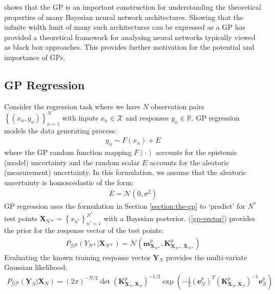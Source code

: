 \documentclass{article}
\newcommand{\GP}{\operatorname{\mathcal{GP}}}
\numberwithin{equation}{section}
\begin{document}
\cite{novak2019neural} shows that the GP is an important construction for understanding the theoretical properties of many Bayesian neural network architectures. Showing that the infinite width limit of many such architectures can be expressed as a GP has provided a theoretical framework for analysing neural networks typically viewed as black box approaches. This provides further motivation for the potential and importance of GPs.

\subsection{GP Regression}
Consider the regression task where we have $N$ observation pairs $\left\{(x_n, y_n)\right\}_{n=1}^{N}$ with inputs $x_n \in \mathcal{X}$ and responses $y_n \in \mathbb{R}$. GP regression models the data generating process:
\begin{align}
    y_n \sim F(x_n) + E
    \label{regression-data-uncertainties}
\end{align}
where the GP random function mapping $F(\cdot)$ accounts for the epistemic (model) uncertainty and the random scalar $E$ accounts for the aleatoric (measurement) uncertainty. In this formulation, we assume that the aleatoric uncertainty is homoscedastic of the form:
\begin{align}
    E = \mathcal{N} \left(0, \sigma^2\right)
    \label{aleotric-uncertainty}
\end{align}
GP regression uses the formulation in Section \ref{section:the-gp} to `predict' for $N^*$ test points $\mathbf{X}_{N*} = \left\{ x_{n^*}\right\}_{n^*=1}^{N^*}$ with a Bayesian posterior. (\ref{gp-vector}) provides the prior for the response vector of the test points:
\begin{align}
    \label{gp-prior}
    P_{\GP}\left(Y_{N*}\vert \mathbf{X}_{N*}\right) = \mathcal{N}\left(\mathbf{m}^p_{\mathbf{X}_{N*}}, \mathbf{K}^p_{\mathbf{X}_{N*}, \mathbf{X}_{N*}}\right)
\end{align}
Evaluating the known training response vector $\mathbf{Y}_{N}$ provides the multi-variate Gaussian likelihood:
\begin{align}
     \label{gp-likelihood}
    P_{\GP}\left(\mathbf{Y}_{N} \vert \mathbf{X}_{N} \right) = \left(2 \pi\right)^{-N/2} \det\left(\mathbf{K}^p_{\mathbf{X}_{N}, \mathbf{X}_{N}}\right)^{-1/2} \exp\left(-\frac{1}{2}\left(\mathbf{e}^p_N\right)^T\left(\mathbf{K}^p_{\mathbf{X}_{N}, \mathbf{X}_{N}}\right)^{-1}\mathbf{e}^p_N\right)
    \label{likelihood-normal}
\end{align}
\end{document}
